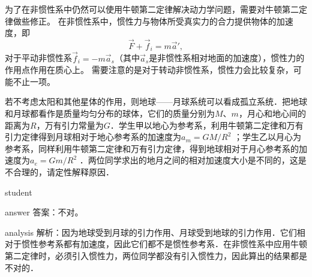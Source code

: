 为了在非惯性系中仍然可以使用牛顿第二定律解决动力学问题，需要对牛顿第二定律做些修正。
在非惯性系中，惯性力与物体所受真实力的合力提供物体的加速度，即
\begin{equation}
\vec{F}+\vec{f}_i = m\vec{a}',
\end{equation}
对于平动非惯性系$ \vec{f}_i = -m\vec{a}_s $（其中$ \vec{a}_s $是非惯性系相对地面的加速度），惯性力的作用点作用在质心上。
需要注意的是对于转动非惯性系，惯性力会比较复杂，可能不止一项。


\begin{example}
	若不考虑太阳和其他星体的作用，则地球——月球系统可以看成孤立系统．把地球和月球都看作是质量均匀分布的球体，它们的质量分别为$ M $、$ m $，月心和地心间的距离为$ R $，万有引力常量为$ G $．学生甲以地心为参考系，利用牛顿第二定律和万有引力定律得到月球相对于地心参考系的加速度为$a_m=GM/R^2$ ；学生乙以月心为参考系，同样利用牛顿第二定律和万有引力定律，得到地球相对于月心参考系的加速度为$a_e=Gm/R^2$ ．两位同学求出的地月之间的相对加速度大小是不同的，这是不合理的，请定性解释原因．
	
	\begin{taggedblock}{student}
		\vspace*{2cm}
	\end{taggedblock}
	
	
	\begin{taggedblock}{answer}
		答案：不对。
	\end{taggedblock}
	
	
	\begin{taggedblock}{analysis}
		解析：因为地球受到月球的引力作用、月球受到地球的引力作用．它们相对于惯性参考系都有加速度，因此它们都不是惯性参考系．在非惯性系中应用牛顿第二定律时，必须引入惯性力，两位同学都没有引入惯性力，因此算出的结果都是不对的．
	\end{taggedblock}
\end{example}


